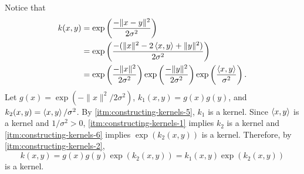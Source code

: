 Notice that
\begin{align*}
    k(x,y)
    &= \exp\left(\frac{-\|x-y\|^2}{2\sigma^2}\right)\\
    &= \exp\left(\frac{-(\|x\|^2 - 2\left\langle x,y \right\rangle + \|y\|^2)}{2\sigma^2}\right)\\
    &= \exp\left(\frac{-\|x\|^2}{2\sigma^2}\right)
    \exp\left(\frac{-\|y\|^2}{2\sigma^2}\right)
    \exp\left(\frac{\left\langle x,y \right\rangle}{\sigma^2}\right).
\end{align*}
Let \(g(x) = \exp\left(-\|x\|^2/2\sigma^2\right)\), \(k_1(x,y) = g(x)g(y)\), and \(k_2(x,y) = \left\langle x,y \right\rangle/\sigma^2\).
By \cref{itm:constructing-kernels-5}, \(k_1\) is a kernel.
Since \(\left\langle x,y \right\rangle\) is a kernel and \(1/\sigma^2 >0\), \cref{itm:constructing-kernels-1} implies \(k_2\) is a kernel and \cref{itm:constructing-kernels-6} implies \(\exp(k_2(x,y))\) is a kernel.
Therefore, by \cref{itm:constructing-kernels-2},
\begin{equation}
    k(x,y) = g(x)g(y) \exp(k_2(x,y)) = k_1(x,y) \exp(k_2(x,y))
\end{equation}
is a kernel.